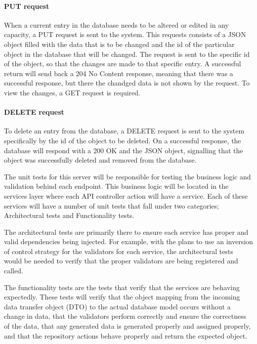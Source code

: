 {{{\paragraph{PUT request}
When a current entry in the database needs to be altered or edited in any capacity, a PUT request is sent to the system. This requests consists of a JSON object filled with the data that is to be changed and the id of the particular object in the database that will be changed. The request is sent to the specific id of the object, so that the changes are made to that specific entry. A successful return will send back a 204 No Content response, meaning that there was a successful response, but there the chandged data is not shown by the request. To view the changes, a GET request is required. 

\paragraph{DELETE request}
To delete an entry from the database, a DELETE request is sent to the system specifically by the id of the object to be deleted. On a successful response, the database will respond with a 200 OK and the JSON object, signalling that the object was successfully deleted and removed from the database. 
\newline
{\setlength{\parindent}{0cm}


The unit tests for this server will be responsible for testing the business logic and validation behind each endpoint. This business logic will be located in the services layer where each API controller action will have a service. Each of these services will have a number of unit tests that fall under two categories; Architectural tests and Functionality tests.
\newline
{\setlength{\parindent}{0cm}

The architectural tests are primarily there to ensure each service has proper and valid dependencies being injected. For example, with the plans to use an inversion of control strategy for the validators for each service, the architectural tests would be needed to verify that the proper validators are being registered and called.
\newline
{\setlength{\parindent}{0cm}

The functionality tests are the tests that verify that the services are behaving expectedly. These tests will verify that the object mapping from the incoming data transfer object (DTO) to the actual database model occurs without a change in data, that the validators perform correctly and ensure the correctness of the data, that any generated data is generated properly and assigned properly, and that the repository actions behave properly and return the expected object.
}}}}}}
